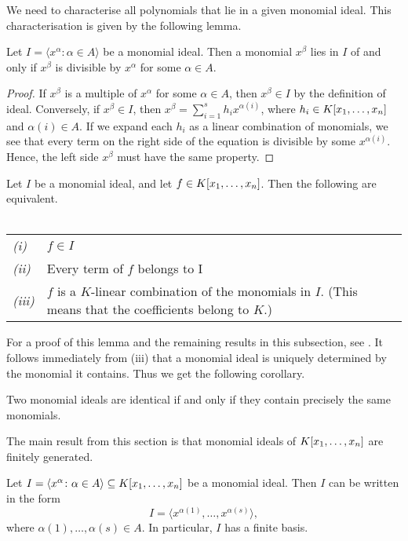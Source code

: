 \documentclass[english,bachelor]{liumaiex}
\begin{document}
We need to characterise all polynomials that lie in a given monomial ideal. This characterisation is given by the following lemma.
\begin{lem}\label{lem:memb}
Let $I=\langle x^\alpha\colon \alpha\in A\rangle$ be a monomial ideal. Then a monomial $x^\beta$ lies in $I$ of and only if $x^\beta$ is divisible by $x^\alpha$ for some $\alpha\in A$.
\end{lem}
\begin{proof}
If $x^\beta$ is a multiple of $x^\alpha$ for some $\alpha\in A$, then $x^\beta\in I$ by the definition of ideal. Conversely, if $x^\beta\in I$, then $x^\beta=\sum_{i=1}^{s}h_ix^{\alpha(i)}$, where $h_i\in K[x_1,\dots, x_n]$ and $\alpha(i)\in A$. If we expand each $h_i$ as a linear combination of monomials, we see that every term on the right side of the equation is divisible by some $x^{\alpha(i)}$. Hence, the left side $x^\beta$ must have the same property.
\end{proof}

\begin{lem}
Let $I$ be a monomial ideal, and let $f\in K[x_1,\dots, x_n]$. Then the following are equivalent.\\ \\
\begin{tabular}{l p{8cm}}
\emph{(i)} & $f\in I$\\
\emph{(ii)} & Every term of $f$ belongs to I\\
\emph{(iii)} & $f$ is a $K$-linear combination of the monomials in $I$. (This means that the coefficients belong to $K$.)
\end{tabular}
\end{lem}

For a proof of this lemma and the remaining results in this subsection, see \cite[p. 71]{cox}. It follows immediately from (iii) that a monomial ideal is uniquely determined by the monomial it contains. Thus we get the following corollary.

\begin{cor}
Two monomial ideals are identical if and only if they contain precisely the same monomials.
\end{cor}

The main result from this section is that monomial ideals of $K[x_1,\dots, x_n]$ are finitely generated.

\begin{thm}
Let $I=\langle x^\alpha\colon\alpha\in A\rangle\subseteq K[x_1,\dots, x_n]$ be a monomial ideal. Then $I$ can be written in the form
\begin{displaymath}
I=\langle x^{\alpha(1)},\dots,x^{\alpha(s)}\rangle,
\end{displaymath}
where $\alpha(1),\dots,\alpha(s)\in A$. In particular, $I$ has a finite basis.
\end{thm}
\end{document}
